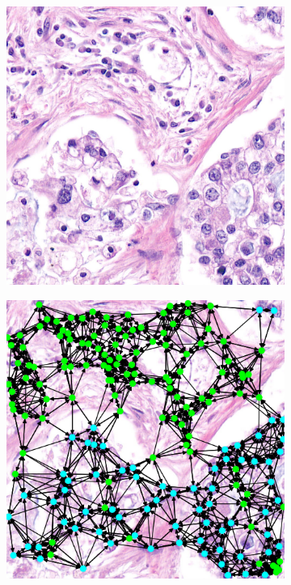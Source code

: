 \begin{figure}[h]
    \centering
    \begin{subfigure}{0.3\textwidth}
      \centering
      \includegraphics[width=\textwidth]{imgs/img_ex.png}
    \end{subfigure}
    \begin{subfigure}{0.3\textwidth}
      \centering
      \includegraphics[width=\textwidth]{imgs/graph_overlay.png}

\end{subfigure}
\end{figure}
